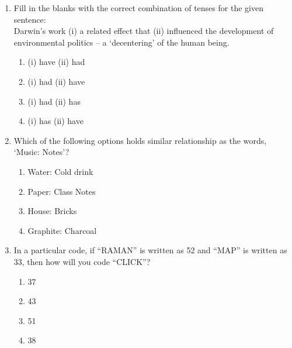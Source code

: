 \documentclass{article}
\begin{document}
\begin{enumerate}[leftmargin=*, start=11, label=Q.\arabic*.]
    \item Fill in the blanks with the correct combination of tenses for the given sentence: \\
    Darwin’s work (i)\makebox[1.5cm]{\hrulefill} a related effect that (ii)\makebox[1.5cm]{\hrulefill} influenced the development of environmental politics – a ‘decentering’ of the human being.
    
    \begin{multicols}{4}
        \begin{enumerate}
            \item (i) have (ii) had
            \item (i) had (ii) have
            \item (i) had (ii) has
            \item (i) has (ii) have
        \end{enumerate}
    \end{multicols}

    \item Which of the following options holds similar relationship as the words, ‘Music: Notes’?
    
    \begin{multicols}{4}
        \begin{enumerate}
            \item  Water: Cold drink
            \item Paper: Class Notes
            \item  House: Bricks
            \item Graphite: Charcoal
        \end{enumerate}
    \end{multicols}

    \item In a particular code, if “RAMAN” is written as 52 and “MAP” is written as 33, then how will you code “CLICK”?
    
    \begin{multicols}{4}
        \begin{enumerate}
            \item 37
            \item 43
            \item 51
            \item 38
        \end{enumerate}
    \end{multicols}

\end{enumerate}    
\end{document}
